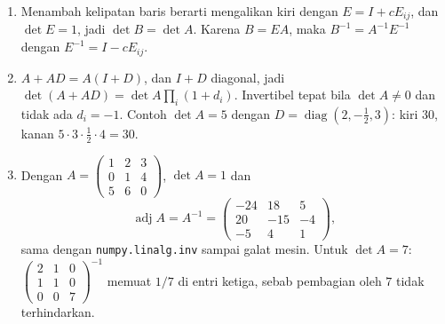 \begin{enumerate}[label=\textbf{8.\arabic*}]
  \item Menambah kelipatan baris berarti mengalikan kiri dengan
        $E=I+cE_{ij}$, dan $\det E=1$, jadi $\det B=\det A$. Karena $B=EA$,
        maka $B^{-1}=A^{-1}E^{-1}$ dengan $E^{-1}=I-cE_{ij}$.

  \item $A+AD=A(I+D)$, dan $I+D$ diagonal, jadi
        $\det(A+AD)=\det A\prod_{i}(1+d_{i})$. Invertibel tepat bila
        $\det A\ne0$ dan tidak ada $d_{i}=-1$. Contoh $\det A=5$ dengan
        $D=\operatorname{diag}(2,-\tfrac12,3)$: kiri $30$, kanan
        $5\cdot3\cdot\tfrac12\cdot4=30$.

  \item Dengan $A=\begin{pmatrix}1&2&3\\0&1&4\\5&6&0\end{pmatrix}$,
        $\det A=1$ dan
        \[
          \operatorname{adj}A=A^{-1}=
          \begin{pmatrix}-24&18&5\\20&-15&-4\\-5&4&1\end{pmatrix},
        \]
        sama dengan \texttt{numpy.linalg.inv} sampai galat mesin. Untuk
        $\det A=7$:
        $\begin{pmatrix}2&1&0\\1&1&0\\0&0&7\end{pmatrix}^{-1}$ memuat
        $1/7$ di entri ketiga, sebab pembagian oleh $7$ tidak terhindarkan.
\end{enumerate}

